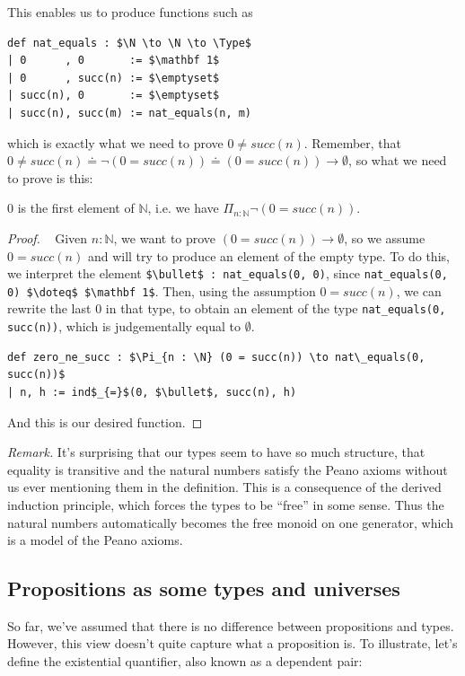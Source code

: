 \documentclass[a4paper, 12pt]{article}
\newcommand{\N}{\mathbb{N}}
\newcommand{\Type}{\mathit{Type}}
\theoremstyle{changedot}
\theoremstyle{changedotbreak}
\theoremstyle{nonumberplain}
\newtheorem{proof}{Proof}
\begin{document}
This enables us to produce functions such as

\begin{lstlisting}[mathescape=true]
def nat_equals : $\N \to \N \to \Type$
| 0      , 0       := $\mathbf 1$
| 0      , succ(n) := $\emptyset$
| succ(n), 0       := $\emptyset$
| succ(n), succ(m) := nat_equals(n, m)
\end{lstlisting}

which is exactly what we need to prove $0 \neq succ(n)$. Remember, that $0 \neq succ(n) \doteq \neg(0 = succ(n)) \doteq (0 = succ(n)) \to \emptyset$, so what we need to prove is this:

\begin{theorem}\label{thm:zero_ne_succ}
  $0$ is the first element of $\N$, i.e. we have $\Pi_{n:\N} \neg(0 = succ(n))$.
\end{theorem}
\begin{proof}~
  Given $n : \N$, we want to prove $(0 = succ(n)) \to \emptyset$, so we assume $0 = succ(n)$ and will try to produce an element of the empty type. To do this, we interpret the element \lstinline{$\bullet$ : nat_equals(0, 0)}, since \lstinline{nat_equals(0, 0) $\doteq$ $\mathbf 1$}. Then, using the assumption $0 = succ(n)$, we can rewrite the last $0$ in that type, to obtain an element of the type \lstinline{nat_equals(0, succ(n))}, which is judgementally equal to $\emptyset$.

\begin{lstlisting}[mathescape=true]
def zero_ne_succ : $\Pi_{n : \N} (0 = succ(n)) \to nat\_equals(0, succ(n))$
| n, h := ind$_{=}$(0, $\bullet$, succ(n), h)
\end{lstlisting}
  And this is our desired function.
\end{proof}

\textit{Remark.} It's surprising that our types seem to have so much structure, that equality is transitive and the natural numbers satisfy the Peano axioms without us ever mentioning them in the definition. This is a consequence of the derived induction principle, which forces the types to be ``free'' in some sense. Thus the natural numbers automatically becomes the free monoid on one generator, which is a model of the Peano axioms.

\subsection{Propositions as some types and universes}
So far, we've assumed that there is no difference between propositions and types. However, this view doesn't quite capture what a proposition is. To illustrate, let's define the existential quantifier, also known as a dependent pair:
\end{document}
